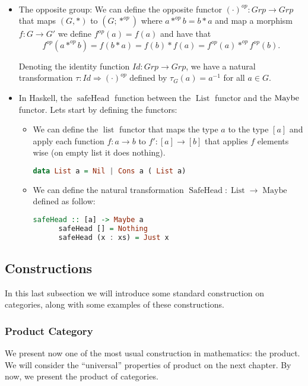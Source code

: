   \begin{example}\ 
    \begin{itemize}
    \item The opposite group: We can define the opposite functor $(\cdot)^{op}: Grp \to Grp$ that maps $(G, *)$ to $(G; *^{op})$ where $a*^{op}b= b*a$ and map a morphism $f: G \to G'$ we define $f^{op}(a) = f(a)$ and have that
      $$ f^{op}(a*^{op}b) = f(b*a) = f(b)*f(a) = f^{op}(a) *^{op} f^{op}(b).$$

Denoting the identity function $Id:Grp\to Grp$, we have a natural transformation $\tau:Id \Rightarrow (\cdot)^{op}$ defined by $\tau_G(a)=a^{-1}$ for all $a\in G$.
\item In Haskell, the $\operatorname{safeHead}$ \cite[Section 10.1]{milewski2018category} function between the $\operatorname{List}$ functor and the $\operatorname{Maybe}$ functor. Lets start by defining the functors:
  \begin{itemize}
  \item We can define the $\operatorname{list}$ functor that maps the type $a$ to the type $[a]$ and apply each function $f:a\to b$ to $f':[a]\to [b]$ that applies $f$ elements wise (on empty list it does nothing).
    \begin{lstlisting}[language=Haskell,captionpos=b]
    data List a = Nil | Cons a ( List a)
    \end{lstlisting}
  \item  We can define the natural transformation $\operatorname{SafeHead}: \operatorname{List} \to \operatorname{Maybe}$ defined as follow:
    \begin{lstlisting}[language=Haskell,captionpos=b]
      safeHead :: [a] -> Maybe a
      safeHead [] = Nothing
      safeHead (x : xs) = Just x
    \end{lstlisting}
  \end{itemize}
    \end{itemize}
  \end{example}

  
\subsection{Constructions}
In this last subsection we will introduce some standard construction on categories, along with some examples of these constructions.


\subsubsection{Product Category}
We present now one of the most usual construction in mathematics: the product. We will consider the ``universal'' properties of product on the next chapter. By now, we present the product of categories.

